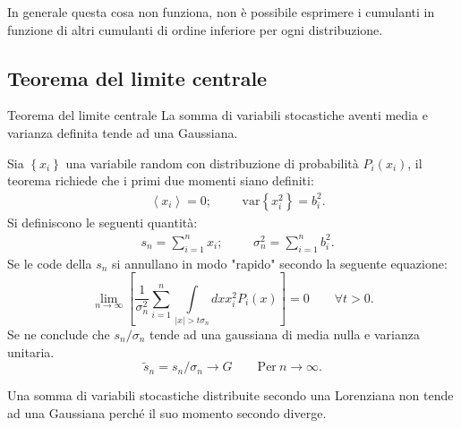 \noindent
In generale questa cosa non funziona, non è possibile esprimere i cumulanti in funzione di altri cumulanti di ordine inferiore per ogni distribuzione.

\subsection{Teorema del limite centrale}%
\label{sub:Teorema del limite centrale}
\begin{redbox}{Teorema del limite centrale}
   La somma di variabili stocastiche aventi media e varianza definita tende ad una Gaussiana. 
\end{redbox}
\noindent
Sia $\left\{x_i\right\}$ una variabile random con distribuzione di probabilità $P_i(x_i)$, il teorema richiede che i primi due momenti siano definiti:
\[\begin{aligned}
    & \left<x_i\right> = 0; &&
    & \text{var}\left\{x_i^2\right\} = b_i^2
.\end{aligned}\]
Si definiscono le seguenti quantità:
\[\begin{aligned}
    & s_n = \sum_{i=1}^{n} x_i;
    &&
    &\sigma_n^2 = \sum_{i=1}^{n} b_i^2
.\end{aligned}\]
Se le code della $s_n$ si annullano in modo "rapido" secondo la seguente equazione:
\[
    \lim_{n \to \infty} 
    \left[\frac{1}{\sigma_n^2} \sum_{i=1}^{n} \int\limits_{\left|x\right|>t\sigma_n}^{} dx x^2_i P_i(x)  \right] 
    = 0 \qquad \forall t>0
.\] 
Se ne conclude che $s_n/\sigma_n$ tende ad una gaussiana di media nulla e varianza unitaria.
\[
    \tilde{s}_n = s_n /\sigma_n \to G \qquad \mbox{Per} \ n \to \infty
.\] 
\begin{exmp}
    Una somma di variabili stocastiche distribuite secondo una Lorenziana non tende ad una Gaussiana perché il suo momento secondo diverge.
\end{exmp}
\noindent
